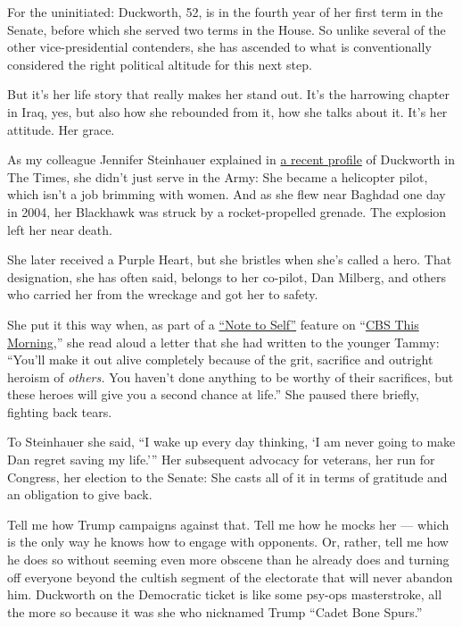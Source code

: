 For the uninitiated: Duckworth, 52, is in the fourth year of her first
term in the Senate, before which she served two terms in the House. So
unlike several of the other vice-presidential contenders, she has
ascended to what is conventionally considered the right political
altitude for this next step.

But it's her life story that really makes her stand out. It's the
harrowing chapter in Iraq, yes, but also how she rebounded from it, how
she talks about it. It's her attitude. Her grace.

As my colleague Jennifer Steinhauer explained in
\href{https://www.nytimes3xbfgragh.onion/2020/06/25/us/politics/tammy-duckworth-vice-president-joe-biden.html}{a
recent profile} of Duckworth in The Times, she didn't just serve in the
Army: She became a helicopter pilot, which isn't a job brimming with
women. And as she flew near Baghdad one day in 2004, her Blackhawk was
struck by a rocket-propelled grenade. The explosion left her near death.

She later received a Purple Heart, but she bristles when she's called a
hero. That designation, she has often said, belongs to her co-pilot, Dan
Milberg, and others who carried her from the wreckage and got her to
safety.

She put it this way when, as part of a
\href{https://www.cbsnews.com/news/note-to-self-senator-tammy-duckworth/}{``Note
to Self''} feature on
``\href{https://www.cbsnews.com/news/note-to-self-senator-tammy-duckworth/}{CBS
This Morning},'' she read aloud a letter that she had written to the
younger Tammy: ``You'll make it out alive completely because of the
grit, sacrifice and outright heroism of \emph{others.} You haven't done
anything to be worthy of their sacrifices, but these heroes will give
you a second chance at life.'' She paused there briefly, fighting back
tears.

To Steinhauer she said, ``I wake up every day thinking, `I am never
going to make Dan regret saving my life.''' Her subsequent advocacy for
veterans, her run for Congress, her election to the Senate: She casts
all of it in terms of gratitude and an obligation to give back.

Tell me how Trump campaigns against that. Tell me how he mocks her ---
which is the only way he knows how to engage with opponents. Or, rather,
tell me how he does so without seeming even more obscene than he already
does and turning off everyone beyond the cultish segment of the
electorate that will never abandon him. Duckworth on the Democratic
ticket is like some psy-ops masterstroke, all the more so because it was
she who nicknamed Trump ``Cadet Bone Spurs.''

